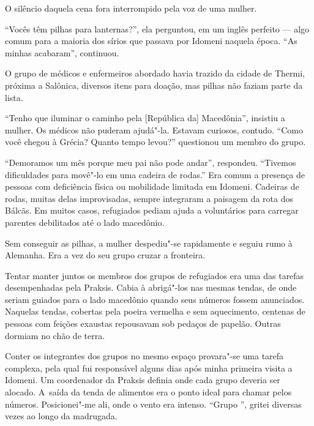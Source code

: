 
O silêncio daquela cena fora interrompido pela voz de uma mulher.

``Vocês têm pilhas para lanternas?'', ela perguntou, em um inglês
perfeito --- algo comum para a maioria dos sírios que passava por
Idomeni naquela época. ``As minhas acabaram'', continuou.

O grupo de médicos e enfermeiros abordado havia trazido da cidade de
Thermi, próxima a Salônica, diversos itens para doação, mas pilhas não faziam parte da lista.

``Tenho que iluminar o caminho pela {[}República da{]} Macedônia'',
insistiu a mulher. Os médicos não puderam ajudá"-la. Estavam curiosos,
contudo. ``Como você chegou à Grécia? Quanto tempo levou?'' questionou
um membro do grupo.

``Demoramos um mês porque meu pai não pode andar'', respondeu.
``Tivemos dificuldades para movê"-lo em uma cadeira de rodas.''
 Era comum a presença de pessoas com deficiência física ou mobilidade limitada em Idomeni.
 Cadeiras de rodas, muitas delas improvisadas, sempre integraram a paisagem da rota dos Bálcãs. Em muitos
casos, refugiados pediam ajuda a voluntários para carregar parentes
debilitados até o lado macedônio.

Sem conseguir as pilhas, a mulher despediu"-se rapidamente e seguiu rumo
à Alemanha. Era a vez do seu grupo cruzar a fronteira.


Tentar manter juntos os membros dos grupos de refugiados era uma das
tarefas desempenhadas pela Praksis. Cabia à  abrigá"-los nas mesmas
tendas, de onde seriam guiados para o lado macedônio quando seus
números fossem anunciados. Naquelas tendas, cobertas pela poeira
vermelha e sem aquecimento, centenas de pessoas com feições exaustas
repousavam sob pedaços de papelão. Outras dormiam no chão de terra.

Conter os integrantes dos grupos no mesmo espaço provara"-se uma tarefa
complexa, pela qual fui responsável alguns dias após minha primeira
visita a Idomeni. Um coordenador da Praksis definia onde cada grupo
deveria ser alocado. A~saída da tenda de alimentos era o ponto ideal
para chamar pelos números. Posicionei"-me ali, onde o vento era intenso. ``Grupo '', gritei diversas vezes
ao longo da madrugada.

